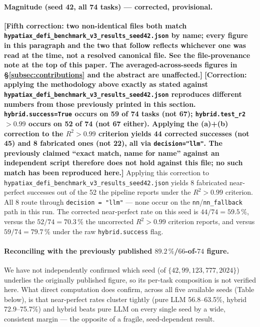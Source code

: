 \documentclass[twoside,11pt]{article}
\newcommand{\Rsq}{R^{2}}
\begin{document}
\paragraph{Magnitude (seed 42, all 74 tasks) --- \textbf{corrected,
provisional}.}
\textbf{[Fifth correction: two non-identical files both match
\texttt{hypatiax\_defi\_benchmark\_v3\_results\_seed42.json} by name; every
figure in this paragraph and the two that follow reflects whichever one
was read at the time, not a resolved canonical file. See the
file-provenance note at the top of this paper. The averaged-across-seeds
figures in \S\ref{subsec:contributions} and the abstract are unaffected.]}
\textbf{[Correction: applying the methodology above exactly as stated
against \texttt{hypatiax\_defi\_benchmark\_v3\_results\_seed42.json}
reproduces different numbers from those previously printed in this
section. \texttt{hybrid.success=True} occurs on 59 of 74 tasks (not 67);
\texttt{hybrid.test\_r2}$>0.99$ occurs on 52 of 74 (not 67 either).
Applying the (a)+(b) correction to the $\Rsq>0.99$ criterion yields 44
corrected successes (not 45) and 8 fabricated ones (not 22), all via
\texttt{decision="llm"}. The previously claimed ``exact match, name for
name'' against an independent script therefore does not hold against
this file; no such match has been reproduced here.]}
Applying this correction to
\texttt{hypatiax\_defi\_benchmark\_v3\_results\_seed42.json} yields 8
fabricated near-perfect successes out of the 52 the pipeline reports
under the $\Rsq>0.99$ criterion. All 8 route through
\texttt{decision = "llm"} --- none occur on the
\texttt{nn}/\texttt{nn\_fallback} path in this run. The corrected
near-perfect rate on this seed is $44/74 = 59.5\,\%$, versus the
$52/74 = 70.3\,\%$ the uncorrected $\Rsq>0.99$ criterion reports, and
versus $59/74=79.7\,\%$ under the raw \texttt{hybrid.success} flag.

\paragraph{Reconciling with the previously published $89.2\,\%$/$66$-of-$74$
figure.} We have not independently confirmed which seed (of $\{42, 99,
123, 777, 2024\}$) underlies the originally published figure, so its
per-task composition is not verified here. What direct computation
does confirm, across all five available seeds (Table below), is that
near-perfect rates cluster tightly (pure LLM 56.8--63.5\%, hybrid
72.9--75.7\%) and hybrid beats pure LLM on every single seed by a wide,
consistent margin --- the opposite of a fragile, seed-dependent result.
\end{document}
